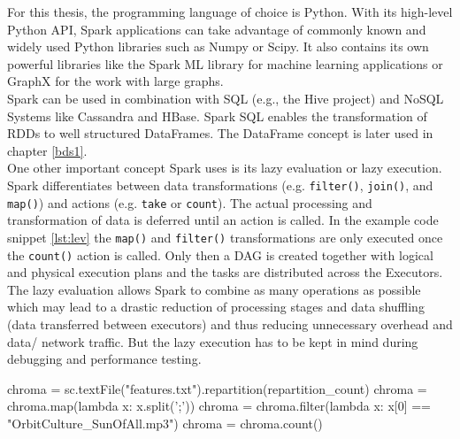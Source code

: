 For this thesis, the programming language of choice is Python. With its high-level Python API, Spark applications can take advantage of commonly known and widely used Python libraries such as Numpy or Scipy. It also contains its own powerful libraries like the Spark ML library for machine learning applications or GraphX for the work with large graphs.\\ 
Spark can be used in combination with SQL (e.g., the Hive project) and NoSQL Systems like Cassandra and HBase. Spark SQL enables the transformation of RDDs to well structured DataFrames. The DataFrame concept is later used in chapter \ref{bds1}.\\
One other important concept Spark uses is its lazy evaluation or lazy execution. Spark differentiates between data transformations (e.g. \lstinline{filter()}, \lstinline{join()}, and \lstinline{map()}) and actions (e.g. \lstinline{take} or \lstinline{count}). The actual processing and transformation of data is deferred until an action is called. In the example code snippet \ref{lst:lev} the \lstinline{map()} and \lstinline{filter()} transformations are only executed once the \lstinline{count()} action is called. Only then a DAG is created together with logical and physical execution plans and the tasks are distributed across the Executors. The lazy evaluation allows Spark to combine as many operations as possible which may lead to a drastic reduction of processing stages and data shuffling (data transferred between executors) and thus reducing unnecessary overhead and data/ network traffic. But the lazy execution has to be kept in mind during debugging and performance testing. \cite[p.73]{sparkbook1}

\begin{pythonCode}[frame=single,label={lst:lev},caption={lazy evaluation},captionpos=b]
chroma = sc.textFile("features.txt").repartition(repartition_count)
chroma = chroma.map(lambda x: x.split(';'))
chroma = chroma.filter(lambda x: x[0] == "OrbitCulture_SunOfAll.mp3")
chroma = chroma.count()
\end{pythonCode}

